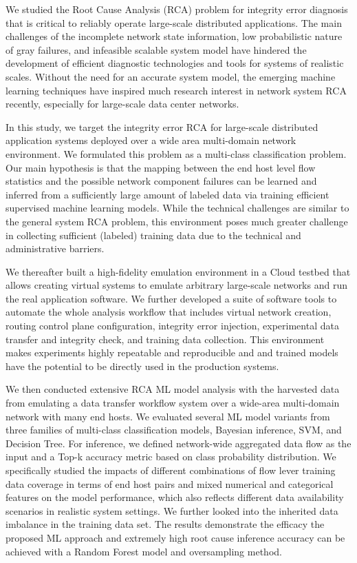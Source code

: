 We studied the Root Cause Analysis (RCA) problem for integrity error diagnosis that is critical to reliably operate large-scale distributed applications. The main challenges of the incomplete network state information, low probabilistic nature of gray failures, and infeasible scalable system model have hindered the development of efficient diagnostic technologies and tools for systems of realistic scales. Without the need for an accurate system model, the emerging machine learning techniques have inspired much research interest in network system RCA recently, especially for large-scale data center networks.

In this study, we target the integrity error RCA for large-scale distributed application systems deployed over a wide area multi-domain network environment. We formulated this problem as a multi-class classification problem. Our main hypothesis is that the mapping between the end host level flow statistics and the possible network component failures can be learned and inferred from a sufficiently large amount of labeled data via training efficient supervised machine learning models. While the technical challenges are similar to the general system RCA problem, this environment poses much greater challenge in collecting sufficient (labeled) training data due to the technical and administrative barriers.  

We thereafter built a high-fidelity emulation environment in a Cloud testbed that allows creating virtual systems to emulate arbitrary large-scale networks and run the real application software. We further developed a suite of software tools to automate the whole analysis workflow that includes virtual network creation, routing control plane configuration, integrity error injection, experimental data transfer and integrity check, and training data collection. This environment makes experiments highly repeatable and reproducible and and trained models have the potential to be directly used in the production systems.   

We then conducted extensive RCA ML model analysis with the harvested data from emulating a data transfer workflow system over a wide-area multi-domain network with many end hosts. We evaluated several ML model variants from three families of multi-class classification models, Bayesian inference, SVM, and Decision Tree. For inference, we defined network-wide aggregated data flow as the input and a Top-k accuracy metric based on class probability distribution. We specifically studied the impacts of different combinations of flow lever training data coverage in terms of end host pairs and mixed numerical and categorical features on the model performance, which also reflects different data availability scenarios in realistic system settings. We further looked into the inherited data imbalance in the training data set. The results demonstrate the efficacy the proposed ML approach and extremely high root cause inference accuracy can be achieved with a Random Forest model and oversampling method.    

